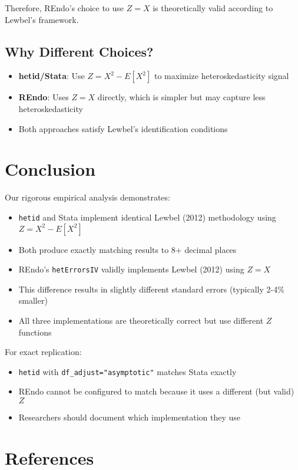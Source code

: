 \documentclass[12pt]{article}
\begin{document}
Therefore, REndo's choice to use $Z = X$ is theoretically valid according to Lewbel's framework.

\subsection{Why Different Choices?}

\begin{itemize}
\item \textbf{hetid/Stata}: Use $Z = X^2 - E[X^2]$ to maximize heteroskedasticity signal
\item \textbf{REndo}: Uses $Z = X$ directly, which is simpler but may capture less heteroskedasticity
\item Both approaches satisfy Lewbel's identification conditions
\end{itemize}

\section{Conclusion}

Our rigorous empirical analysis demonstrates:

\begin{itemize}
\item \texttt{hetid} and Stata implement identical Lewbel (2012) methodology using $Z = X^2 - E[X^2]$
\item Both produce exactly matching results to 8+ decimal places
\item REndo's \texttt{hetErrorsIV} validly implements Lewbel (2012) using $Z = X$
\item This difference results in slightly different standard errors (typically 2-4\% smaller)
\item All three implementations are theoretically correct but use different $Z$ functions
\end{itemize}

For exact replication:
\begin{itemize}
\item \texttt{hetid} with \texttt{df\_adjust="asymptotic"} matches Stata exactly
\item REndo cannot be configured to match because it uses a different (but valid) $Z$
\item Researchers should document which implementation they use
\end{itemize}

\section*{References}
\end{document}
